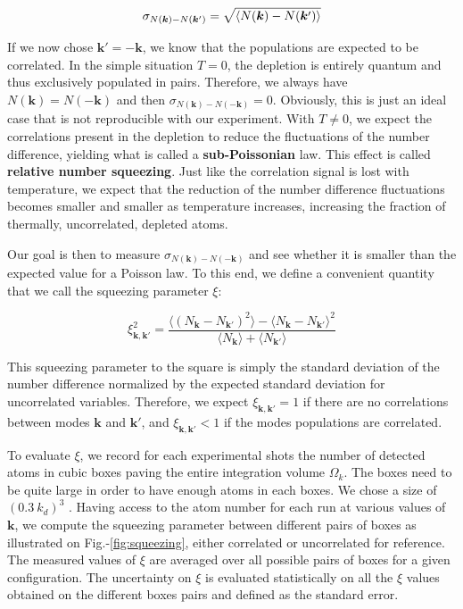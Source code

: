 \begin{equation}
    \sigma_{N(\bm{k})-N(\bm{k}')} = \sqrt{\left\langle N(\bm{k})-N(\bm{k}')\right\rangle}
\end{equation}

If we now chose $\bm{k}'=-\bm{k}$, we know that the populations are expected to be correlated. In the simple situation $T=0$, the depletion is entirely quantum and thus exclusively populated in pairs. Therefore, we always have $N(\bm{k})=N(-\bm{k})$ and then $\sigma_{N(\bm{k})-N(-\bm{k})}=0$. Obviously, this is just an ideal case that is not reproducible with our experiment. With $T \neq 0$, we expect the \kmk correlations present in the depletion to reduce the fluctuations of the number difference, yielding what is called a \textbf{sub-Poissonian} law. This effect is called \textbf{relative number squeezing}. Just like the \kmk correlation signal is lost with temperature, we expect that the reduction of the number difference fluctuations becomes smaller and smaller as temperature increases, increasing the fraction of thermally, uncorrelated, depleted atoms. 

Our goal is then to measure $\sigma_{N(\bm{k})-N(-\bm{k})}$ and see whether it is smaller than the expected value for a Poisson law. To this end, we define a convenient quantity that we call the squeezing parameter $\xi$: 

\begin{equation}
    \xi_{\bm{k},\bm{k'}}^2=\frac{\langle (N_{\bm{k}} - N_{\bm{k'}})^2 \rangle - \langle N_{\bm{k}} - N_{\bm{k'}} \rangle^2}{\langle N_{\bm{k}} \rangle + \langle N_{\bm{k'}} \rangle}
\end{equation}

This squeezing parameter to the square is simply the standard deviation of the number difference normalized by the expected standard deviation for uncorrelated variables. Therefore, we expect $\xi_{\bm{k},\bm{k}'}=1$ if there are no correlations between modes $\bm{k}$ and $\bm{k'}$, and $\xi_{\bm{k},\bm{k}'} < 1$ if the modes populations are correlated.

To evaluate $\xi$, we record for each experimental shots the number of detected atoms in cubic boxes paving the entire integration volume $\Omega_k$. The boxes need to be quite large in order to have enough atoms in each boxes. We chose a size of $(0.3 \ k_d)^3$ . Having access to the atom number for each run at various values of $\bm{k}$, we compute the squeezing parameter between different pairs of boxes as illustrated on Fig.-\ref{fig:squeezing}, either correlated or uncorrelated for reference. The measured values of $\xi$ are averaged over all possible pairs of boxes for a given configuration. The uncertainty on $\xi$ is evaluated statistically on all the $\xi$ values obtained on the different boxes pairs and defined as the standard error.

